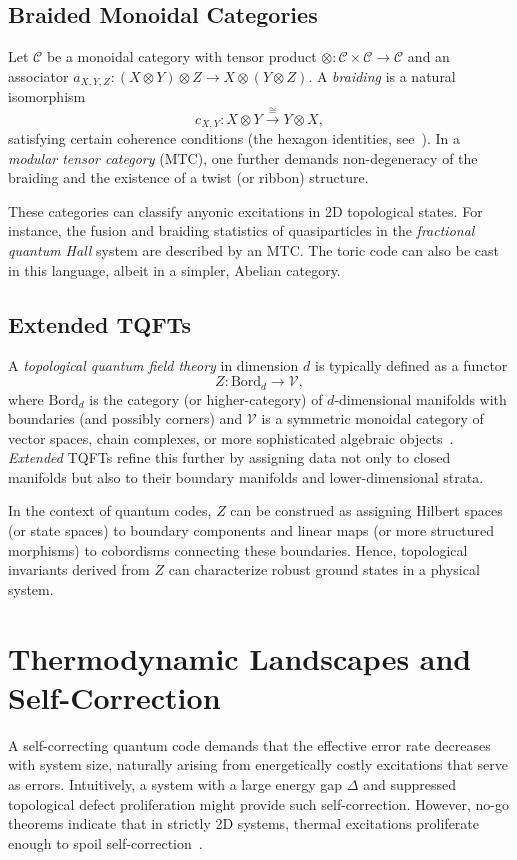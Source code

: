 \documentclass[12pt]{article}
\begin{document}
\subsection{Braided Monoidal Categories}
Let $\mathcal{C}$ be a monoidal category with tensor product $\otimes : \mathcal{C} \times \mathcal{C} \to \mathcal{C}$ and an associator $a_{X,Y,Z} : (X\otimes Y)\otimes Z \to X\otimes (Y\otimes Z)$. A \emph{braiding} is a natural isomorphism 
\[
c_{X,Y} : X \otimes Y \xrightarrow{\cong} Y \otimes X,
\]
satisfying certain coherence conditions (the hexagon identities, see~\cite{kassel2008quantum}). In a \emph{modular tensor category} (MTC), one further demands non-degeneracy of the braiding and the existence of a twist (or ribbon) structure. 

These categories can classify anyonic excitations in 2D topological states. For instance, the fusion and braiding statistics of quasiparticles in the \emph{fractional quantum Hall} system are described by an MTC. The toric code can also be cast in this language, albeit in a simpler, Abelian category.

\subsection{Extended TQFTs}
A \emph{topological quantum field theory} in dimension $d$ is typically defined as a functor
\[
Z : \mathrm{Bord}_d \longrightarrow \mathcal{V},
\]
where $\mathrm{Bord}_d$ is the category (or higher-category) of $d$-dimensional manifolds with boundaries (and possibly corners) and $\mathcal{V}$ is a symmetric monoidal category of vector spaces, chain complexes, or more sophisticated algebraic objects~\cite{atiyah1988topological, freed2019lectures}. \emph{Extended} TQFTs refine this further by assigning data not only to closed manifolds but also to their boundary manifolds and lower-dimensional strata. 

In the context of quantum codes, $Z$ can be construed as assigning Hilbert spaces (or state spaces) to boundary components and linear maps (or more structured morphisms) to cobordisms connecting these boundaries. Hence, topological invariants derived from $Z$ can characterize robust ground states in a physical system.

\section{Thermodynamic Landscapes and Self-Correction}
A self-correcting quantum code demands that the effective error rate decreases with system size, naturally arising from energetically costly excitations that serve as errors. Intuitively, a system with a large energy gap $\Delta$ and suppressed topological defect proliferation might provide such self-correction. However, no-go theorems indicate that in strictly 2D systems, thermal excitations proliferate enough to spoil self-correction~\cite{nussinov2008autocorrelations, bravyi2009no}.
\end{document}
